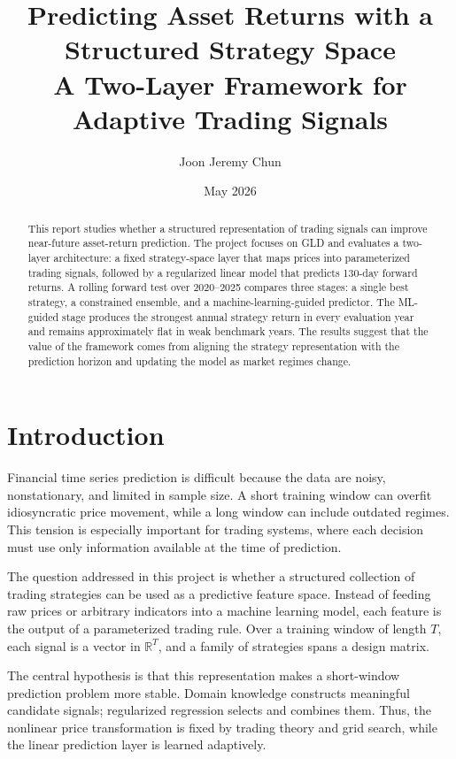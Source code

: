 \documentclass[11pt, letterpaper]{article}
\title{\textbf{Predicting Asset Returns with a Structured Strategy Space}\\
\large A Two-Layer Framework for Adaptive Trading Signals}
\author{Joon Jeremy Chun}
\date{May 2026}
\begin{document}
\maketitle

\begin{abstract}
This report studies whether a structured representation of trading signals can improve near-future asset-return prediction. The project focuses on GLD and evaluates a two-layer architecture: a fixed strategy-space layer that maps prices into parameterized trading signals, followed by a regularized linear model that predicts 130-day forward returns. A rolling forward test over 2020--2025 compares three stages: a single best strategy, a constrained ensemble, and a machine-learning-guided predictor. The ML-guided stage produces the strongest annual strategy return in every evaluation year and remains approximately flat in weak benchmark years. The results suggest that the value of the framework comes from aligning the strategy representation with the prediction horizon and updating the model as market regimes change.
\end{abstract}

\section{Introduction}

Financial time series prediction is difficult because the data are noisy, nonstationary, and limited in sample size. A short training window can overfit idiosyncratic price movement, while a long window can include outdated regimes. This tension is especially important for trading systems, where each decision must use only information available at the time of prediction.

The question addressed in this project is whether a structured collection of trading strategies can be used as a predictive feature space. Instead of feeding raw prices or arbitrary indicators into a machine learning model, each feature is the output of a parameterized trading rule. Over a training window of length $T$, each signal is a vector in $\mathbb{R}^T$, and a family of strategies spans a design matrix.

The central hypothesis is that this representation makes a short-window prediction problem more stable. Domain knowledge constructs meaningful candidate signals; regularized regression selects and combines them. Thus, the nonlinear price transformation is fixed by trading theory and grid search, while the linear prediction layer is learned adaptively.
\end{document}
